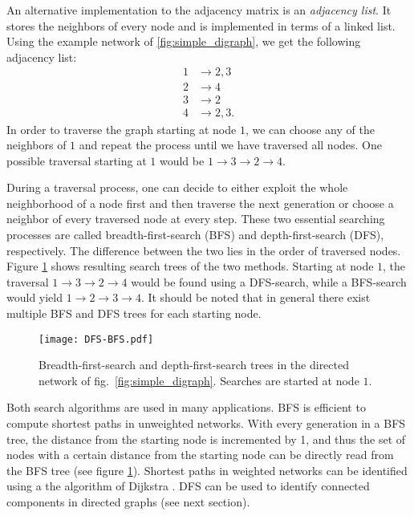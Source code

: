 \documentclass[openright,twoside,headsepline]{scrbook}
\begin{document}
An alternative implementation to the adjacency matrix is an \emph{adjacency list}.
It stores the neighbors of every node and is implemented in terms of a linked list.
Using the example network of \ref{fig:simple_digraph}, we get the following adjacency list:
\begin{align*}
1 &\rightarrow 2,3 \\
2 &\rightarrow 4 \\
3 &\rightarrow 2 \\
4 &\rightarrow 2,3 .
\end{align*}
In order to traverse the graph starting at node $1$, we can choose any of the neighbors of $1$ and repeat the process until we have traversed all nodes.
One possible traversal starting at $1$ would be $1\rightarrow 3 \rightarrow 2 \rightarrow 4$.

During a traversal process, one can decide to either exploit the whole neighborhood of a node first and then traverse the next generation or choose a neighbor of every traversed node at every step.
These two essential searching processes are called breadth-first-search (BFS) and depth-first-search (DFS), respectively.
The difference between the two lies in the order of traversed nodes.
Figure \ref{fig:dfs_bfs} shows resulting search trees of the two methods.
Starting at node $1$, the traversal $1\rightarrow 3 \rightarrow 2 \rightarrow 4$ would be found using a DFS-search, while a BFS-search would yield $1\rightarrow 2 \rightarrow 3 \rightarrow 4$.
It should be noted that in general there exist multiple BFS and DFS trees for each starting node. 
%
\begin{figure}[htbp]
\begin{center}
\texttt{[image: DFS-BFS.pdf]}
\caption{Breadth-first-search and depth-first-search trees in the directed network of fig.~\ref{fig:simple_digraph}. Searches are started at node $1$.}
\label{fig:dfs_bfs}
\end{center}
\end{figure}

Both search algorithms are used in many applications.
BFS is efficient to compute shortest paths in unweighted networks.
With every generation in a BFS tree, the distance from the starting node is incremented by 1, and thus the set of nodes with a certain distance from the starting node can be directly read from the BFS tree (see figure \ref{fig:dfs_bfs}).
Shortest paths in weighted networks can be identified using a the algorithm of Dijkstra \citep{Dijkstra:1959}.
DFS can be used to identify connected components in directed graphs (see next section).
\end{document}
